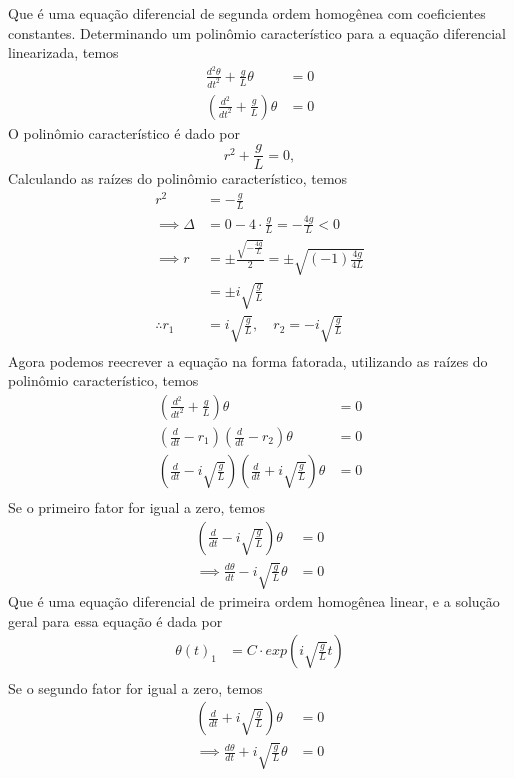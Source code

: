 \documentclass[12pt,a4paper]{article}
\begin{document}
Que é uma equação diferencial de segunda ordem homogênea com coeficientes constantes.
Determinando um polinômio característico para a equação diferencial linearizada, temos
\begin{align}
    \frac{d^2\theta}{dt^2} + \frac{g}{L} \theta &= 0 \nonumber \\
    \left(\frac{d^2}{dt^2} + \frac{g}{L}\right) \theta &= 0
\end{align}
O polinômio característico é dado por
\begin{equation}
    r^2 + \frac{g}{L} = 0,
\end{equation}
Calculando as raízes do polinômio característico, temos
\begin{align*}
    r^2 &= -\frac{g}{L} \\
    \implies \Delta &= 0 - 4 \cdot \frac{g}{L} = -\frac{4g}{L} < 0 \\
    \implies r &= \pm \frac{\sqrt{-\frac{4g}{L}}}{2} = \pm \sqrt{(-1)\frac{4g}{4L}}\\
    &= \pm i \sqrt{\frac{g}{L}} \\
    \therefore r_1 &= i \sqrt{\frac{g}{L}}, \quad r_2 = -i \sqrt{\frac{g}{L}} \\
\end{align*}
Agora podemos reecrever a equação na forma fatorada, utilizando as raízes do polinômio característico, temos
\begin{align*}
    \left(\frac{d^2}{dt^2} + \frac{g}{L}\right) \theta &= 0 \\
    \left(\frac{d}{dt} - r_1\right)\left(\frac{d}{dt} - r_2\right) \theta &= 0 \\
    \left(\frac{d}{dt} - i \sqrt{\frac{g}{L}}\right)\left(\frac{d}{dt} + i \sqrt{\frac{g}{L}}\right) \theta &= 0 \\
\end{align*}
Se o primeiro fator for igual a zero, temos
\begin{align*}
    \left(\frac{d}{dt} - i \sqrt{\frac{g}{L}}\right) \theta &= 0 \\
    \implies \frac{d\theta}{dt} - i \sqrt{\frac{g}{L}} \theta&= 0
\end{align*}
Que é uma equação diferencial de primeira ordem homogênea linear, e a solução geral para essa equação é dada por
\begin{align*}
    \theta(t)_{1} &= C \cdot exp\left(i \sqrt{\frac{g}{L}} t\right) \\
\end{align*}
Se o segundo fator for igual a zero, temos
\begin{align*}
    \left(\frac{d}{dt} + i \sqrt{\frac{g}{L}}\right) \theta &= 0 \\
    \implies \frac{d\theta}{dt} + i \sqrt{\frac{g}{L}} \theta&= 0
\end{align*}
\end{document}
